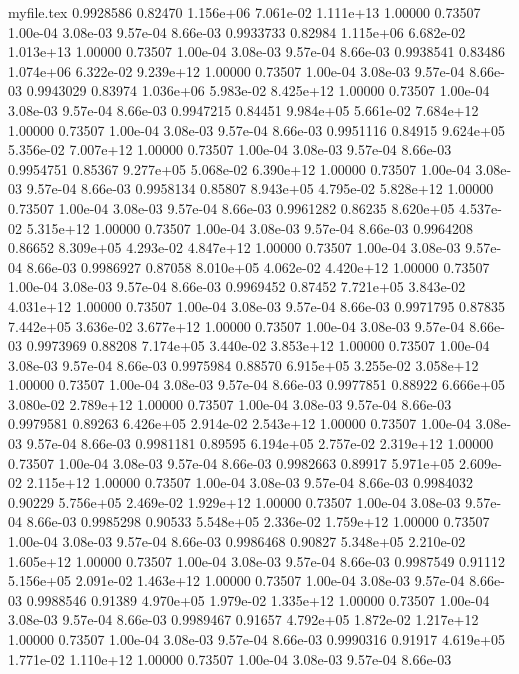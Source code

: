 \begin{filecontents}{myfile.tex}
0.9928586 0.82470 1.156e+06 7.061e-02 1.111e+13 1.00000 0.73507 1.00e-04 3.08e-03 9.57e-04 8.66e-03
0.9933733 0.82984 1.115e+06 6.682e-02 1.013e+13 1.00000 0.73507 1.00e-04 3.08e-03 9.57e-04 8.66e-03
0.9938541 0.83486 1.074e+06 6.322e-02 9.239e+12 1.00000 0.73507 1.00e-04 3.08e-03 9.57e-04 8.66e-03
0.9943029 0.83974 1.036e+06 5.983e-02 8.425e+12 1.00000 0.73507 1.00e-04 3.08e-03 9.57e-04 8.66e-03
0.9947215 0.84451 9.984e+05 5.661e-02 7.684e+12 1.00000 0.73507 1.00e-04 3.08e-03 9.57e-04 8.66e-03
0.9951116 0.84915 9.624e+05 5.356e-02 7.007e+12 1.00000 0.73507 1.00e-04 3.08e-03 9.57e-04 8.66e-03
0.9954751 0.85367 9.277e+05 5.068e-02 6.390e+12 1.00000 0.73507 1.00e-04 3.08e-03 9.57e-04 8.66e-03
0.9958134 0.85807 8.943e+05 4.795e-02 5.828e+12 1.00000 0.73507 1.00e-04 3.08e-03 9.57e-04 8.66e-03
0.9961282 0.86235 8.620e+05 4.537e-02 5.315e+12 1.00000 0.73507 1.00e-04 3.08e-03 9.57e-04 8.66e-03
0.9964208 0.86652 8.309e+05 4.293e-02 4.847e+12 1.00000 0.73507 1.00e-04 3.08e-03 9.57e-04 8.66e-03
0.9986927 0.87058 8.010e+05 4.062e-02 4.420e+12 1.00000 0.73507 1.00e-04 3.08e-03 9.57e-04 8.66e-03
0.9969452 0.87452 7.721e+05 3.843e-02 4.031e+12 1.00000 0.73507 1.00e-04 3.08e-03 9.57e-04 8.66e-03
0.9971795 0.87835 7.442e+05 3.636e-02 3.677e+12 1.00000 0.73507 1.00e-04 3.08e-03 9.57e-04 8.66e-03
0.9973969 0.88208 7.174e+05 3.440e-02 3.853e+12 1.00000 0.73507 1.00e-04 3.08e-03 9.57e-04 8.66e-03
0.9975984 0.88570 6.915e+05 3.255e-02 3.058e+12 1.00000 0.73507 1.00e-04 3.08e-03 9.57e-04 8.66e-03
0.9977851 0.88922 6.666e+05 3.080e-02 2.789e+12 1.00000 0.73507 1.00e-04 3.08e-03 9.57e-04 8.66e-03
0.9979581 0.89263 6.426e+05 2.914e-02 2.543e+12 1.00000 0.73507 1.00e-04 3.08e-03 9.57e-04 8.66e-03
0.9981181 0.89595 6.194e+05 2.757e-02 2.319e+12 1.00000 0.73507 1.00e-04 3.08e-03 9.57e-04 8.66e-03
0.9982663 0.89917 5.971e+05 2.609e-02 2.115e+12 1.00000 0.73507 1.00e-04 3.08e-03 9.57e-04 8.66e-03
0.9984032 0.90229 5.756e+05 2.469e-02 1.929e+12 1.00000 0.73507 1.00e-04 3.08e-03 9.57e-04 8.66e-03
0.9985298 0.90533 5.548e+05 2.336e-02 1.759e+12 1.00000 0.73507 1.00e-04 3.08e-03 9.57e-04 8.66e-03
0.9986468 0.90827 5.348e+05 2.210e-02 1.605e+12 1.00000 0.73507 1.00e-04 3.08e-03 9.57e-04 8.66e-03
0.9987549 0.91112 5.156e+05 2.091e-02 1.463e+12 1.00000 0.73507 1.00e-04 3.08e-03 9.57e-04 8.66e-03
0.9988546 0.91389 4.970e+05 1.979e-02 1.335e+12 1.00000 0.73507 1.00e-04 3.08e-03 9.57e-04 8.66e-03
0.9989467 0.91657 4.792e+05 1.872e-02 1.217e+12 1.00000 0.73507 1.00e-04 3.08e-03 9.57e-04 8.66e-03
0.9990316 0.91917 4.619e+05 1.771e-02 1.110e+12 1.00000 0.73507 1.00e-04 3.08e-03 9.57e-04 8.66e-03

\end{filecontents}
